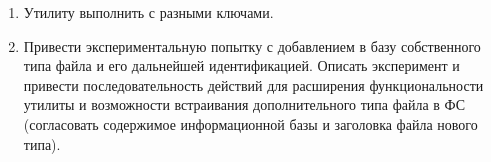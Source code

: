 \begin{enumerate}
\begin{enumerate}
			\item Утилиту  выполнить с разными ключами.
			\item Привести экспериментальную попытку с добавлением в базу собственного типа файла и его дальнейшей идентификацией. Описать эксперимент и привести последовательность действий для расширения функциональности утилиты  и возможности встраивания дополнительного типа файла в ФС (согласовать содержимое информационной базы и заголовка файла нового типа).
		\end{enumerate}

\end{enumerate}